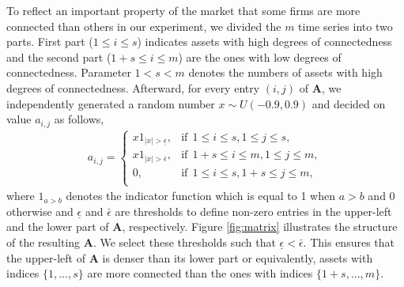 

To reflect an important property of the market that some firms are more connected than others in our experiment, we divided the $m$ time series into two parts. 
First part ($1\leq i\leq s$) indicates assets with high degrees of connectedness and the second part ($1+s\leq i\leq m$) are the ones with low degrees of connectedness.
Parameter $1<s<m$ denotes the numbers of assets with high degrees of connectedness.
Afterward, for every entry $(i,j)$ of $\textbf{A}$, we independently generated a random number $x\sim U(-0.9, 0.9)$ and decided on value $a_{i,j}$ as follows,
\begin{align}\label{eq:rules}
    a_{i,j}=\left\{
\begin{array}{ll}
      x 1_{|x| > \underline{\epsilon} },  & \text{if}\ \ 1\leq i\leq s, 1\leq j\leq s, \\
      x 1_{|x| > \overline{\epsilon} },  & \text{if}\ \ 1+s\leq i\leq m, 1\leq j\leq m, \\
      0,  & \text{if}\ \ 1\leq i\leq s, 1+s\leq j\leq m, \\
\end{array} 
\right.
\end{align}
where $1_{a>b}$ denotes the indicator function which is equal to 1 when $a>b$ and $0$ otherwise and $\underline{\epsilon}$ and $\bar{\epsilon}$ are thresholds to define non-zero entries in the upper-left and the lower part of $\textbf{A}$, respectively.
Figure \ref{fig:matrix} illustrates the structure of the resulting $\textbf{A}$.
We select these thresholds such that $\underline{\epsilon}<\bar{\epsilon}$. 
This ensures that the upper-left of $\textbf{A}$ is denser than its lower part or equivalently, assets with indices $\{1,...,s\}$ are more connected than the ones with indices $\{1+s,...,m\}$.
